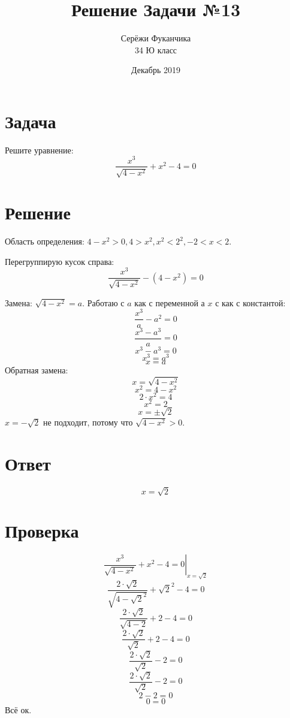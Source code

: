 \documentclass{article}
\title{Решение Задачи №13}
\author{Серёжи Фуканчика\\34 Ю класс}
\date{Декабрь 2019}
\begin{document}
\maketitle

\section{Задача}
Решите уравнение:
$$\frac{x^3}{\sqrt{4-x^2}}+x^2-4=0$$

\section{Решение}
Область определения: $4-x^2>0, 4>x^2, x^2<2^2, -2<x<2$.

Перегруппирую кусок справа:
$$\frac{x^3}{\sqrt{4-x^2}}-(4-x^2)=0$$

Замена: $\sqrt{4-x^2}=a$. Работаю с $a$ как с переменной а $x$ с как с константой:
$$\frac{x^3}{a}-a^2=0$$
$$\frac{x^3-a^3}{a}=0$$
$$x^3-a^3=0$$
$$x^3=a^3$$
$$x=a$$
Обратная замена:
$$x=\sqrt{4-x^2}$$
$$x^2=4-x^2$$
$$2\cdot{}x^2=4$$
$$x^2=2$$
$$x=\pm{}\sqrt{2}$$
$x=-\sqrt{2}$ не подходит, потому что $\sqrt{4-x^2} > 0$.

\section{Ответ}
$$x=\sqrt{2}$$

\section{Проверка}
$$\left.\frac{x^3}{\sqrt{4-x^2}}+x^2-4=0\right|_{x=\sqrt{2}}$$
$$\frac{2\cdot{}\sqrt{2}}{\sqrt{4-\sqrt{2}^2}}+\sqrt{2}^2-4=0$$
$$\frac{2\cdot{}\sqrt{2}}{\sqrt{4-2}}+2-4=0$$
$$\frac{2\cdot{}\sqrt{2}}{\sqrt{2}}+2-4=0$$
$$\frac{2\cdot{}\sqrt{2}}{\sqrt{2}}-2=0$$
$$\frac{2\cdot{}\sqrt{2}}{\sqrt{2}}-2=0$$
$$2-2=0$$
$$0=0$$
Всё ок.
\end{document}
